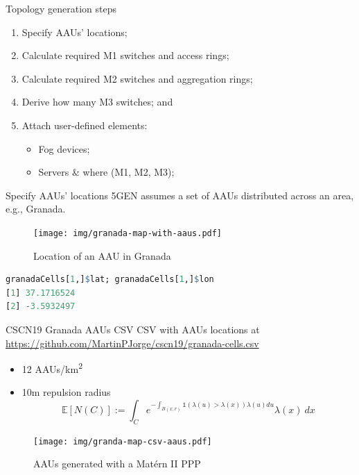 \documentclass{beamer}
\begin{document}
\begin{frame}{Topology generation steps}
    \begin{enumerate}
        \item Specify AAUs' locations;
        \item Calculate required M1 switches and access rings;
        \item Calculate required M2 switches and aggregation rings;
        \item Derive how many M3 switches; and
        \item Attach user-defined elements:
            \begin{itemize}
                \item Fog devices;
                \item Servers \& where (M1, M2, M3);
            \end{itemize}
    \end{enumerate}
\end{frame}


\begin{frame}[fragile]{Specify AAUs' locations}
    5GEN assumes a set of AAUs distributed across an area, e.g., Granada.

    \begin{figure}
        \texttt{[image: img/granada-map-with-aaus.pdf]}
        \caption{Location of an AAU in Granada}
    \end{figure}


    \begin{lstlisting}[language=R]
granadaCells[1,]$lat; granadaCells[1,]$lon
[1] 37.1716524
[2] -3.5932497\end{lstlisting}
\end{frame}



\begin{frame}{CSCN19 Granada AAUs CSV}
    CSV with AAUs locations at \url{https://github.com/MartinPJorge/cscn19/granada-cells.csv}
    \begin{itemize}
        \item 12 AAUs/km\textsuperscript{2}
        \item 10m repulsion radius
        \begin{equation}
            \mathbb{E}\left[ N(C) \right] := \int_C e^{-\int_{B(x,r)} \mathds{1}\left(\lambda(u) > \lambda(x) \right) \lambda(u) du} \lambda(x)\ dx
            \label{eq:inh-matern2-avg}
        \end{equation}
    \end{itemize}

    \begin{figure}
        \texttt{[image: img/granda-map-csv-aaus.pdf]}
        \caption{AAUs generated with a Matérn II PPP \cite{repulsion}}
    \end{figure}
\end{frame}
\end{document}
